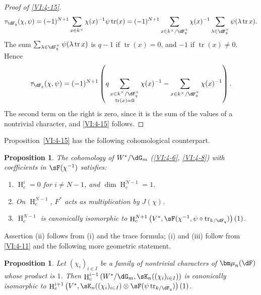 \documentclass[12pt,oneside,english]{smfbook}
\DeclareMathOperator{\h}{H}
\DeclareMathOperator{\tr}{tr}
\newcommand{\dmu}{{\bm\mu}}
\newcounter{char}
\newtheorem{proposition_}[subsection]{Proposition}
\begin{document}
\begin{proof}[Proof of \ref{VI:4-15}]
\[
  \tau_{\dF_q}(\chi,\psi) = (-1)^{N+1} \sum_{x\in k^\times} \chi(x)^{-1} \psi \tr(x) = (-1)^{N+1} \sum_{x\in k^\times/\dF_q^\times} \chi(x)^{-1} \sum_{\lambda\in \dF_q^\times} \psi(\lambda \tr x) \text{.}
\]
The sum $\sum_{\lambda\in\dF_q^\times}\psi(\lambda\tr x)$ is $q-1$ if $\tr(x)=0$, and $-1$ if $\tr(x)\ne0$. Hence
\[
  \tau_{\dF_q}(\chi,\psi)
  =(-1)^{N+1}\left(
    q\sum_{\substack{x\in k^\times/\dF_q^\times\\ \tr(x)=0}}\chi(x)^{-1}
    -\sum_{x\in k^\times/\dF_q^\times}\chi(x)^{-1}\right).
\]
The second term on the right is zero, since it is the sum of the values of a nontrivial character, and \ref{VI:4-15} follows.
\end{proof}

Proposition~\ref{VI:4-15} has the following cohomological counterpart.

\begin{proposition_}\label{VI:4-16}
The cohomology of $W^\ast/\dG_m$ (\ref{VI:4-6}, \ref{VI:4-8}) with coefficients in $\sF(\chi^{-1})$ satisfies:
\begin{enumerate}[\indent (i)]
  \item $\h_c^i=0$ for $i\ne N-1$, and $\dim\h_c^{N-1}{}=1$.
  \item On $\h_c^{N-1}$, $F^\ast$ acts as multiplication by $J(\chi)$.
  \item $\h_c^{N-1}$ is canonically isomorphic to $\h_c^{N+1}\left(V^\ast,\sF(\chi^{-1},\psi\circ \tr_{k/\dF_q})\right)(1)$.
\end{enumerate}
\end{proposition_}

Assertion (ii) follows from (i) and the trace formula; (i) and (iii) follow from \ref{VI:4-11} and the following more geometric statement.

\begin{proposition_}\label{VI:4-17}
Let $(\chi_i)_{i\in I}$ be a family of nontrivial characters of $\dmu_n(\dF)$ whose product is $1$. Then $\h_c^{i-1}\left(W^\ast/\dG_m,\sK_n((\chi_i)_{i\in I})\right)$ is canonically isomorphic to \newline $\h_c^{i+1}\left(V^\ast,\sK_n((\chi_i)_{i\in I})\otimes \sF(\psi\tr_{k/\dF_q})\right)(1)$.
\end{proposition_}
\end{document}
